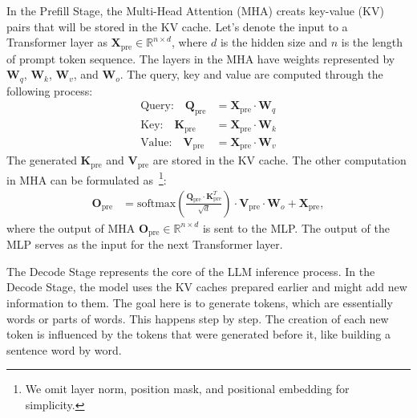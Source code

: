 In the Prefill Stage, the Multi-Head Attention (MHA) creats key-value (KV) pairs that will be stored in the KV cache. Let's denote the input to a Transformer layer as $\mathbf{X}_{\text{pre}} \in \mathbb{R}^{n\times d}$, where $d$ is the hidden size and $n$ is the length of prompt token sequence. The layers in the MHA have weights represented by $\mathbf{W}_q$, $\mathbf{W}_k$, $\mathbf{W}_v$, and $\mathbf{W}_o$.
The query, key and value are computed through the following process:
\begin{align*}
\text{Query:} \quad \mathbf{Q}_{\text{pre}} &=  \mathbf{X}_{\text{pre}} \cdot \mathbf{W}_q \\
\text{Key:} \quad \mathbf{K}_{\text{pre}} &=  \mathbf{X}_{\text{pre}} \cdot \mathbf{W}_k \\
\text{Value:} \quad \mathbf{V}_{\text{pre}} &= \mathbf{X}_{\text{pre}} \cdot \mathbf{W}_v 
\end{align*}
The generated $\mathbf{K}_{\text{pre}}$ and $\mathbf{V}_{\text{pre}}$ are stored in the KV cache. The other computation in MHA can be formulated as~\footnote{We omit layer norm, position mask, and positional embedding for simplicity.}:
\begin{align*}
\mathbf{O}_{\text{pre}} &= \text{softmax}\left(\frac{\mathbf{Q}_{\text{pre}} \cdot \mathbf{K}_{\text{pre}}^T}{\sqrt{d}}\right) \cdot \mathbf{V}_{\text{pre}}\cdot \mathbf{W}_o +\mathbf{X}_{\text{pre}},
\end{align*}
where the output of MHA $\mathbf{O}_{\text{pre}} \in \mathbb{R}^{n\times d}$ is sent to the MLP.
The output of the MLP serves as the input for the next Transformer layer.


The Decode Stage represents the core of the LLM inference process. In the Decode Stage, the model uses the KV caches prepared earlier and might add new information to them. The goal here is to generate tokens, which are essentially words or parts of words. This happens step by step. The creation of each new token is influenced by the tokens that were generated before it, like building a sentence word by word.


